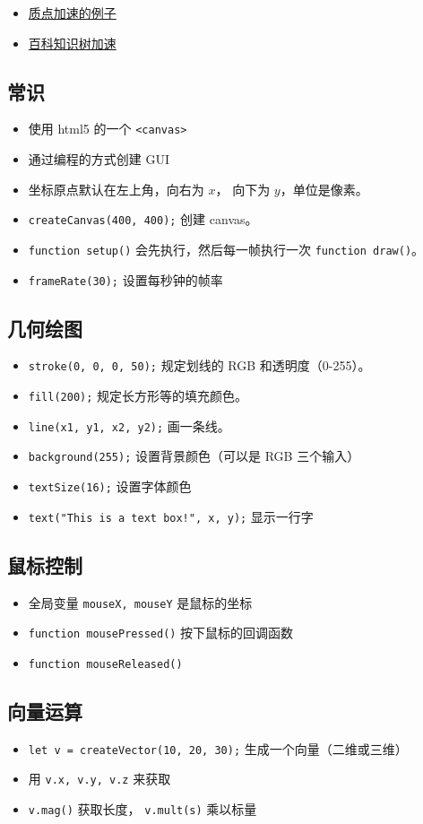 

\begin{itemize}
\item \href{https://wuli.wiki/apps/PtAcc/}{质点加速的例子}
\item \href{https://wuli.wiki/apps/TwoBallSpring/}{百科知识树加速}
\end{itemize}

\subsection{常识}
\begin{itemize}
\item 使用 html5 的一个 \verb`<canvas>`
\item 通过编程的方式创建 GUI
\item 坐标原点默认在左上角，向右为 $x$， 向下为 $y$，单位是像素。
\item \verb`createCanvas(400, 400);` 创建 canvas。
\item \verb`function setup()` 会先执行，然后每一帧执行一次 \verb`function draw()`。
\item \verb`frameRate(30);` 设置每秒钟的帧率
\end{itemize}

\subsection{几何绘图}
\begin{itemize}
\item \verb`stroke(0, 0, 0, 50);` 规定划线的 RGB 和透明度（0-255）。
\item \verb`fill(200);` 规定长方形等的填充颜色。
\item \verb`line(x1, y1, x2, y2);` 画一条线。
\item \verb`background(255);` 设置背景颜色（可以是 RGB 三个输入）
\item \verb`textSize(16);` 设置字体颜色
\item \verb`text("This is a text box!", x, y);` 显示一行字
\end{itemize}

\subsection{鼠标控制}
\begin{itemize}
\item 全局变量 \verb`mouseX, mouseY` 是鼠标的坐标
\item \verb`function mousePressed()` 按下鼠标的回调函数
\item \verb`function mouseReleased()`
\end{itemize}

\subsection{向量运算}
\begin{itemize}
\item \verb`let v = createVector(10, 20, 30);` 生成一个向量（二维或三维）
\item 用 \verb`v.x, v.y, v.z` 来获取
\item \verb`v.mag()` 获取长度， \verb`v.mult(s)` 乘以标量
\end{itemize}

